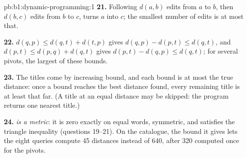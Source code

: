 \begin{solution}{pb:b1:dynamic-programming:1}
\textbf{21.} Following $d(a, b)$ edits from $a$ to $b$, then $d(b, c)$ edits from $b$ to $c$, turns $a$ into $c$; the
smallest number of edits is at most that.

\textbf{22.} $d(q, p) \leq d(q, t) + d(t, p)$ gives $d(q, p) - d(p, t) \leq d(q, t)$, and $d(p, t) \leq d(p, q) + d(q, t)$
gives $d(p, t) - d(q, p) \leq d(q, t)$; for several pivots, the largest of these bounds.

\textbf{23.} The titles come by increasing bound, and each bound is at most the true distance: once a bound reaches the
best distance found, every remaining title is at least that far. (A title at an equal distance may be skipped: the
program returns one nearest title.)

\textbf{24.} \emph{ is a metric}: it is zero exactly on equal words, symmetric, and satisfies the triangle
inequality (questions 19--21). On the catalogue, the bound it gives lets the eight queries compute 45 distances instead
of 640, after 320 computed once for the pivots.
\end{solution}
